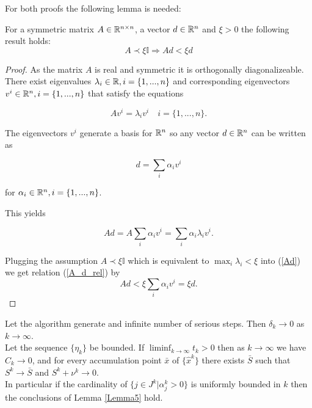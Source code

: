 For both proofs the following lemma is needed:

\begin{lemma}
	For a symmetric matrix \(A \in \mathbb{R}^{n\times n}\), a vector \(d\in \mathbb{R}^n\) and \(\xi > 0\) the following result holds: 
	\[ A \prec \xi \mathbb{I} \Rightarrow Ad < \xi d \]
\end{lemma}

\begin{proof}
	As the matrix \(A\) is real and symmetric it is orthogonally diagonalizeable.
	There exist eigenvalues \(\lambda_i \in \mathbb{R}, i = \{1,...,n\}\) and corresponding eigenvectors \(v^i \in \mathbb{R}^n, i = \{1,...,n\}\) that satisfy the equations
	
	\begin{equation*}
		Av^i= \lambda_iv^i \quad i = \{1,...,n\}.
		\label{A_d_rel}
	\end{equation*}
	
	The eigenvectors \(v^i\) generate a basis for \(\mathbb{R}^n\) so any vector \(d \in \mathbb{R}^n\) can be written as
	
	\[ d = \sum_{i} {\alpha_i v^i} \]
	
	for \(\alpha_i \in \mathbb{R}^n, i = \{1,...,n\}\).
	
	This yields
	
	\begin{equation}
		Ad = A \sum_i{\alpha_i v^i} = \sum_i \alpha_i \lambda_i v^i.
		\label{Ad}
	\end{equation}
	
	Plugging the assumption \(A \prec \xi \mathbb{I}\) which is equivalent to \(\max_i \lambda_i < \xi\) into (\ref{Ad})
	we get relation (\ref{A_d_rel}) by
		\[Ad < \xi \sum_i \alpha_i v^i = \xi d. \]

\end{proof}

\begin{theorem}
	Let the algorithm generate and infinite number of serious steps. Then \(\delta_k \to 0\) as \(k \to \infty\). \\
	Let the sequence \(\{\eta_k\}\) be bounded. If \(\liminf_{k \to \infty} t_k > 0\) then as \(k \to \infty\) we have \(C_k \to 0\), and for every accumulation point \(\bar{x}\) of \(\{\hat{x}^k\}\) there exists \(\bar{S}\) such that \(S^k \to \bar{S}\) and \(S^k + \nu^k \to 0\). \\
	In particular if the cardinality of \(\{j \in J^k|\alpha_j^k > 0\}\) is uniformly bounded in \(k\) then the conclusions of Lemma \ref{Lemma5} hold.
\end{theorem}

